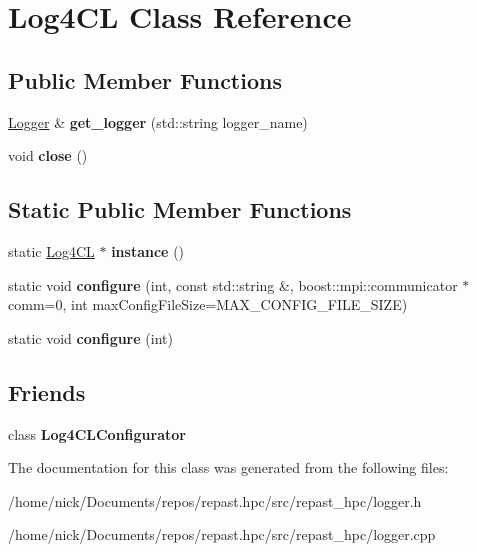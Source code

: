 \hypertarget{class_log4_c_l}{\section{Log4\-C\-L Class Reference}
\label{class_log4_c_l}
}
\subsection*{Public Member Functions}
\begin{DoxyCompactItemize}
\item 
\hypertarget{class_log4_c_l_acf274891399834114393e5440e54d78e}{\hyperlink{class_logger}{Logger} \& {\bfseries get\-\_\-logger} (std\-::string logger\-\_\-name)}\label{class_log4_c_l_acf274891399834114393e5440e54d78e}

\item 
\hypertarget{class_log4_c_l_a79dd02857dbcee7b00431e8508390910}{void {\bfseries close} ()}\label{class_log4_c_l_a79dd02857dbcee7b00431e8508390910}

\end{DoxyCompactItemize}
\subsection*{Static Public Member Functions}
\begin{DoxyCompactItemize}
\item 
\hypertarget{class_log4_c_l_a3657ff59071abde1631607884a04f366}{static \hyperlink{class_log4_c_l}{Log4\-C\-L} $\ast$ {\bfseries instance} ()}\label{class_log4_c_l_a3657ff59071abde1631607884a04f366}

\item 
\hypertarget{class_log4_c_l_aba1953ed8d7bc7c38ccea87c510b952c}{static void {\bfseries configure} (int, const std\-::string \&, boost\-::mpi\-::communicator $\ast$comm=0, int max\-Config\-File\-Size=M\-A\-X\-\_\-\-C\-O\-N\-F\-I\-G\-\_\-\-F\-I\-L\-E\-\_\-\-S\-I\-Z\-E)}\label{class_log4_c_l_aba1953ed8d7bc7c38ccea87c510b952c}

\item 
\hypertarget{class_log4_c_l_a3ccf6dcd6d42d3ad49e60cbbce2b57a3}{static void {\bfseries configure} (int)}\label{class_log4_c_l_a3ccf6dcd6d42d3ad49e60cbbce2b57a3}

\end{DoxyCompactItemize}
\subsection*{Friends}
\begin{DoxyCompactItemize}
\item 
\hypertarget{class_log4_c_l_af0e54cc350bb8e25a6a22bf3f38f21c5}{class {\bfseries Log4\-C\-L\-Configurator}}\label{class_log4_c_l_af0e54cc350bb8e25a6a22bf3f38f21c5}

\end{DoxyCompactItemize}


The documentation for this class was generated from the following files\-:\begin{DoxyCompactItemize}
\item 
/home/nick/\-Documents/repos/repast.\-hpc/src/repast\-\_\-hpc/logger.\-h\item 
/home/nick/\-Documents/repos/repast.\-hpc/src/repast\-\_\-hpc/logger.\-cpp\end{DoxyCompactItemize}
